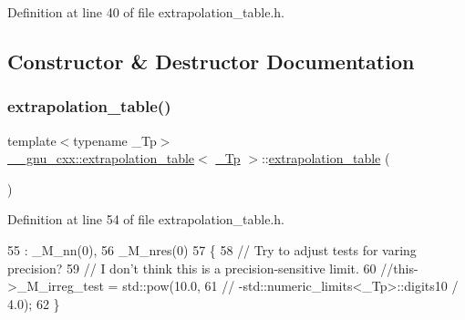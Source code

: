 Definition at line 40 of file extrapolation\+\_\+table.\+h.



\subsection{Constructor \& Destructor Documentation}
\mbox{\label{class____gnu__cxx_1_1extrapolation__table_a7769d0bb61a2b5b0153140d707b2d3a0}} 
\subsubsection{\texorpdfstring{extrapolation\+\_\+table()}{extrapolation\_table()}\hspace{0.1cm}{\footnotesize\ttfamily [1/2]}}
{\footnotesize\ttfamily template$<$typename \+\_\+\+Tp$>$ \\
\hyperlink{class____gnu__cxx_1_1extrapolation__table}{\+\_\+\+\_\+gnu\+\_\+cxx\+::extrapolation\+\_\+table}$<$ \hyperlink{namespace____gnu__cxx_a3b19a9c800ca194374ef9172290f7d79}{\+\_\+\+Tp} $>$\+::\hyperlink{class____gnu__cxx_1_1extrapolation__table}{extrapolation\+\_\+table} (\begin{DoxyParamCaption}{ }\end{DoxyParamCaption})\hspace{0.3cm}{\ttfamily [inline]}}



Definition at line 54 of file extrapolation\+\_\+table.\+h.


\begin{DoxyCode}
55       : \_M\_nn(0),
56         \_M\_nres(0)
57       \{
58         \textcolor{comment}{// Try to adjust tests for varing precision?}
59         \textcolor{comment}{// I don't think this is a precision-sensitive limit.}
60         \textcolor{comment}{//this->\_M\_irreg\_test = std::pow(10.0,}
61         \textcolor{comment}{//                       -std::numeric\_limits<\_Tp>::digits10 / 4.0);}
62       \}
\end{DoxyCode}
\mbox{\label{class____gnu__cxx_1_1extrapolation__table_a9866afc5e42c63b300e21620ad8adac2}} 
